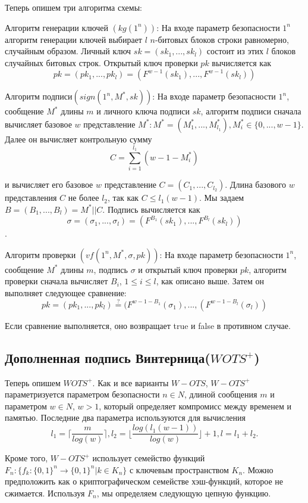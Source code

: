 \documentclass[a4paper, 14pt]{extarticle}
\begin{document}
Теперь опишем три алгоритма схемы:

Алгоритм генерации ключей $(kg(1^{n}))$: На входе параметр безопасности $1^{n}$ алгоритм генерации ключей выбирает $l$ $n$-битовых блоков строки равномерно, случайным образом. Личный ключ $sk = (sk_{1}, ..., sk_{l})$ состоит из этих $l$ блоков случайных битовых строк. Открытый ключ проверки $pk$ вычисляется как
\[ pk = (pk_{1}, ..., pk_{l}) = (F^{w - 1}(sk_{1}), ..., F^{w - 1}(sk_{l})) \]

Алгоритм подписи$(sign(1^{n}, M^{*}, sk))$: На входе параметр безопасности $1^{n}$, сообщение $M^{*}$ длины $m$ и личного ключа подписи $sk$, алгоритм подписи сначала вычисляет базовое $w$ представление $M^{*}: M^{*} = (M^{*}_{1}, ..., M^{*}_{l_{1}}), M^{*}_{i} \in \{0, ..., w - 1\}$. Далее он вычисляет контрольную сумму
\[ C = \sum^{l_{1}}_{i = 1}(w - 1 - M^{*}_{i}) \]

и вычисляет его базовое $w$ представление $C = (C_{1}, ..., C_{l_2})$. Длина базового $w$ представления $C$ не более $l_{2}$, так как $C \leq l_{1}(w - 1)$. Мы задаем $B = (B_{1}, ..., B_{l}) = M^{*} || C$. Подпись вычисляется как
\[ \sigma = (\sigma_{1}, ..., \sigma_{l}) = (F^{B_1}(sk_{1}), ..., F^{B_l}(sk_{l})) \].

Алгоритм проверки $(vf(1^{n}, M^{*}, \sigma, pk))$: На входе параметр безопасности $1^{n}$, сообщение $M^{*}$ длины $m$, подпись $\sigma$ и открытый ключ проверки $pk$, алгоритм проверки сначала вычисляет $B_{i}$, $ 1 \leq i \leq l$, как описано выше. Затем он выполняет следующее сравнение:
\[ pk = (pk_{1}, ..., pk_{l}) \stackrel{?}= (F^{w - 1 - B_{1}}(\sigma_{1}), ..., (F^{w - 1 - B_{l}}(\sigma_{l})) \]

Если сравнение выполняется, оно возвращает true и false в противном случае.
\subsection{Дополненная подпись Винтерница($WOTS^{+}$)}
Теперь опишем $WOTS^{+}$. Как и все варианты $W-OTS$, $W-OTS^{+}$ параметризуется параметром безопасности $n \in N$, длиной сообщения $m$ и параметром $w \in N$, $w > 1$, который определяет компромисс между временем и памятью. Последние два параметра используются для вычисления
\[ l_{1} = \Bigg \lceil \frac{m}{log(w)} \Bigg \rceil, l_{2} = \Bigg \lfloor \frac{log(l_{1}(w - 1))}{log(w)} \Bigg \rfloor + 1, l = l_{1} + l_{2}. \]

Кроме того, $W-OTS^{+}$ использует семейство функций $F_{n} : \{f_{k} : \{0, 1\}^{n} \rightarrow \{0, 1\}^{n}|k \in K_{n}\}$ с ключевым пространством $K_{n}$. Можно предположить как о криптографическом семействе хэш-функций, которое не сжимается. Используя $F_{n}$, мы определяем следующую цепную функцию.
\end{document}
